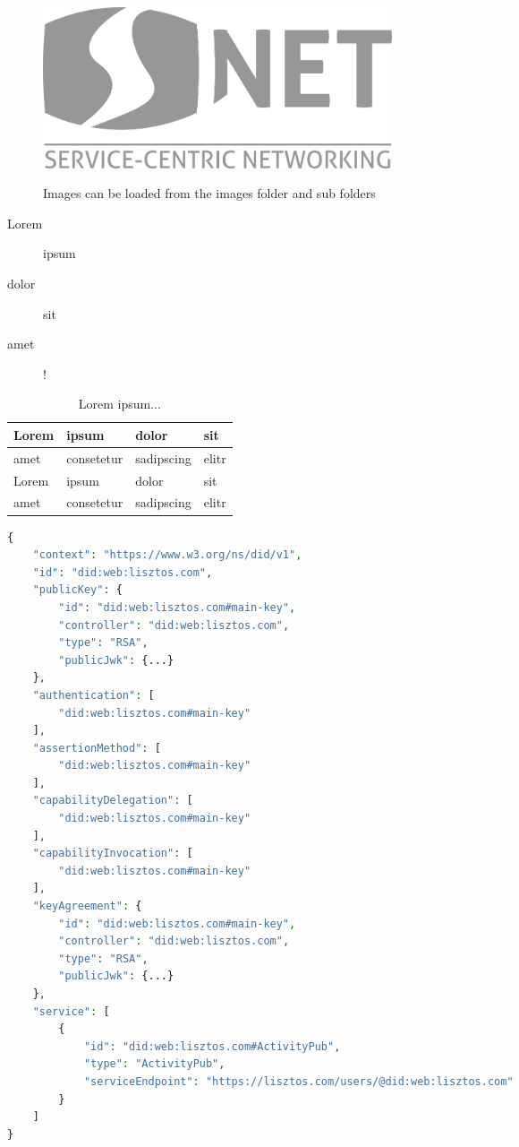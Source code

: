 

\begin{figure}[!ht]
	\centering
	\includegraphics[width=0.5\textwidth]{images/snet_logo_gray.png}\\
	\caption{Images can be loaded from the images folder and sub folders}
	\label{fig:introduction__loremipsum}
\end{figure}


\begin{description}
	\item[Lorem] ipsum
	\item[dolor] sit
	\item[amet] !
\end{description}

\begin{table}[!ht]
	\small
	\centering
	\begin{tabular}{|l|l|l|l|}
		\hline
		Lorem & ipsum & dolor & sit \\
		\hline
		amet & consetetur & sadipscing & elitr \\
		\hline
		Lorem & ipsum & dolor & sit \\
		\hline
		amet & consetetur & sadipscing & elitr \\
		\hline
	\end{tabular}
	\caption{Lorem ipsum...}
\end{table}

\lstset{style=JSONStyle}
\begin{lstlisting}[language=PHP, caption=did:web DID Document, label=fig:did_web_doc, float=h]
  {
    "context": "https://www.w3.org/ns/did/v1",
    "id": "did:web:lisztos.com",
    "publicKey": {
        "id": "did:web:lisztos.com#main-key",
        "controller": "did:web:lisztos.com",
        "type": "RSA",
        "publicJwk": {...}
    },
    "authentication": [
        "did:web:lisztos.com#main-key"
    ],
    "assertionMethod": [
        "did:web:lisztos.com#main-key"
    ],
    "capabilityDelegation": [
        "did:web:lisztos.com#main-key"
    ],
    "capabilityInvocation": [
        "did:web:lisztos.com#main-key"
    ],
    "keyAgreement": {
        "id": "did:web:lisztos.com#main-key",
        "controller": "did:web:lisztos.com",
        "type": "RSA",
        "publicJwk": {...}
    },
    "service": [
        {
            "id": "did:web:lisztos.com#ActivityPub",
            "type": "ActivityPub",
            "serviceEndpoint": "https://lisztos.com/users/@did:web:lisztos.com"
        }
    ]
}
\end{lstlisting}